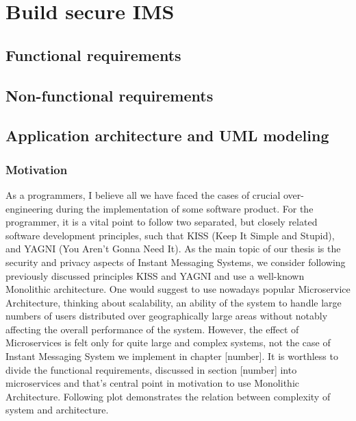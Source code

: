 
\chapter{Build secure IMS}\label{ch:build-secure-ims}


\section{Functional requirements}\label{sec:functional-requirements}


\section{Non-functional requirements}\label{sec:non-functional-requirements}


\section{Application architecture and UML modeling}\label{sec:application-architecture-and-uml-modeling}

\subsection{Motivation}\label{subsec:motivation}
As a programmers, I believe all we have faced the cases of crucial over-engineering during the implementation of some software product.
For the programmer, it is a vital point to follow two separated, but closely related software development principles, such that
KISS (Keep It Simple and Stupid), and YAGNI (You Aren't Gonna Need It).
As the main topic of our thesis is the security and privacy aspects of Instant Messaging Systems, we consider following
previously discussed principles KISS and YAGNI and use a well-known Monolithic architecture.
One would suggest to use nowadays popular Microservice Architecture, thinking about scalability,
an ability of the system to handle large numbers of users distributed over geographically large areas without notably affecting
the overall performance of the system.
However, the effect of Microservices is felt only for quite large and complex systems, not the case of Instant Messaging System
we implement in chapter [number].
It is worthless to divide the functional requirements, discussed in section [number] into microservices and that's central point
in motivation to use Monolithic Architecture.
Following plot demonstrates the relation between complexity of system and architecture.

